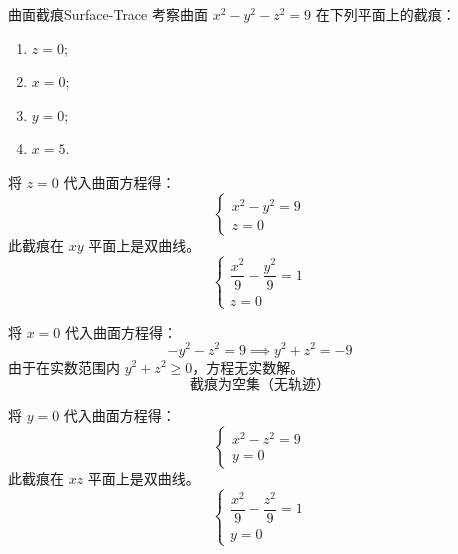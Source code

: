 \begin{problem}{曲面截痕}{Surface-Trace}
    考察曲面 $x^2 - y^2 - z^2 = 9$ 在下列平面上的截痕：
    \begin{enumerate}
        \item $z = 0$;
        \item $x = 0$;
        \item $y = 0$;
        \item $x = 5$.
    \end{enumerate}
\end{problem}

\begin{solution}
    将 $z = 0$ 代入曲面方程得：
    \begin{equation*}
        \begin{cases}
            x^2 - y^2 = 9 \\
            z = 0
        \end{cases}
    \end{equation*}
    此截痕在 $xy$ 平面上是双曲线。
    \begin{equation*}
        \boxed{\begin{cases} \dfrac{x^2}{9} - \dfrac{y^2}{9} = 1 \\ z = 0 \end{cases}}
    \end{equation*}

    将 $x = 0$ 代入曲面方程得：
    \begin{equation*}
        -y^2 - z^2 = 9 \implies y^2 + z^2 = -9
    \end{equation*}
    由于在实数范围内 $y^2 + z^2 \ge 0$，方程无实数解。
    \begin{equation*}
        \boxed{\text{截痕为空集（无轨迹）}}
    \end{equation*}

    将 $y = 0$ 代入曲面方程得：
    \begin{equation*}
        \begin{cases}
            x^2 - z^2 = 9 \\
            y = 0
        \end{cases}
    \end{equation*}
    此截痕在 $xz$ 平面上是双曲线。
    \begin{equation*}
        \boxed{\begin{cases} \dfrac{x^2}{9} - \dfrac{z^2}{9} = 1 \\ y = 0 \end{cases}}
    \end{equation*}


\end{solution}
